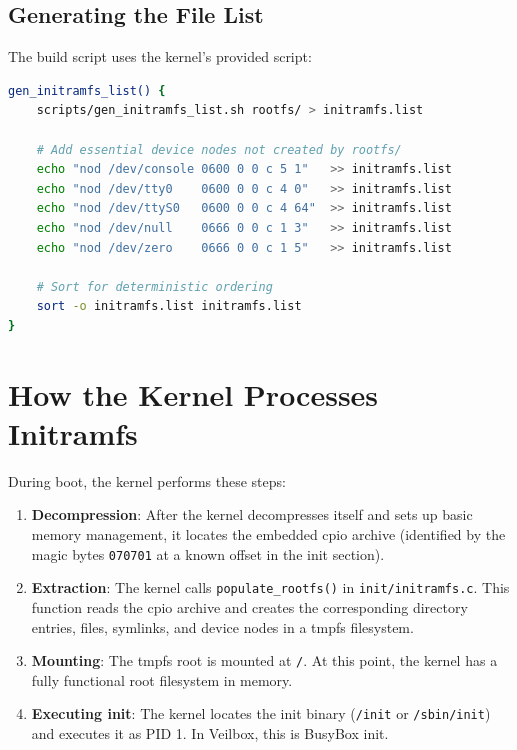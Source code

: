 \subsection{Generating the File List}

The build script uses the kernel's provided script:

\begin{lstlisting}[language=bash]
gen_initramfs_list() {
    scripts/gen_initramfs_list.sh rootfs/ > initramfs.list

    # Add essential device nodes not created by rootfs/
    echo "nod /dev/console 0600 0 0 c 5 1"   >> initramfs.list
    echo "nod /dev/tty0    0600 0 0 c 4 0"   >> initramfs.list
    echo "nod /dev/ttyS0   0600 0 0 c 4 64"  >> initramfs.list
    echo "nod /dev/null    0666 0 0 c 1 3"   >> initramfs.list
    echo "nod /dev/zero    0666 0 0 c 1 5"   >> initramfs.list

    # Sort for deterministic ordering
    sort -o initramfs.list initramfs.list
}
\end{lstlisting}

\section{How the Kernel Processes Initramfs}

During boot, the kernel performs these steps:

\begin{enumerate}[nosep]
  \item \textbf{Decompression}: After the kernel decompresses itself and
        sets up basic memory management, it locates the embedded cpio
        archive (identified by the magic bytes \texttt{070701} at a known
        offset in the init section).
  \item \textbf{Extraction}: The kernel calls \texttt{populate\_rootfs()}
        in \texttt{init/initramfs.c}. This function reads the cpio archive
        and creates the corresponding directory entries, files, symlinks,
        and device nodes in a tmpfs filesystem.
  \item \textbf{Mounting}: The tmpfs root is mounted at \texttt{/}. At
        this point, the kernel has a fully functional root filesystem in
        memory.
  \item \textbf{Executing init}: The kernel locates the init binary
        (\texttt{/init} or \texttt{/sbin/init}) and executes it as PID 1.
        In Veilbox, this is BusyBox init.
\end{enumerate}

